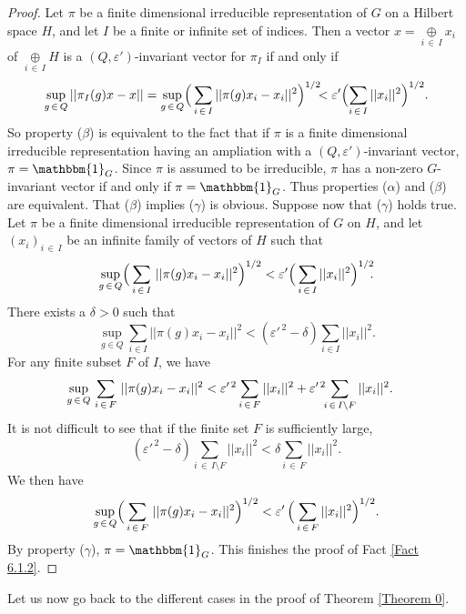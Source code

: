 \documentclass[11pt,english,a4paper]{smfart}
\numberwithin{equation}{section}
\theoremstyle{definition}
\begin{document}
\begin{proof}
 Let $\pi $ be a finite dimensional irreducible  representation of $G$ on 
a Hilbert space $H$, and let $I$ be a finite or infinite set of indices. Then a vector 
$x={\mathop{\oplus}}\limits_{i\,\in\,I}x_{i}$ of ${\mathop{\oplus}}\limits_{i\,\in\,I}H$ is a 
$({Q},\varepsilon')$-invariant vector for $\pi _{I}$ if and only if 
\[
\sup_{g\,\in\,{Q}}||\pi 
_{I}(g)x-x||=\sup_{g\,\in\,{Q}}\Bigl(\,\sum_{i\,\in\,I}||\pi 
(g)x_{i}-x_{i}||^{2} 
\Bigr)^{1/2}\!\!\!<\varepsilon'\Bigl(\sum_{i\,\in\,I}||x_{i}||^{2} \Bigr)^{1/2} .
\]
So property 
($\beta $) is equivalent to the fact that if 
$\pi $ is a finite dimensional irreducible representation having an 
ampliation with a 
$({Q},\varepsilon')$-invariant vector, $\pi =\mathbbm{1}_{G}$. 
Since $\pi $ is assumed to be irreducible, $\pi $ has a non-zero $G$-invariant vector 
if and only if $\pi=\mathbbm{1}_{G}$. Thus pro\-perties
($\alpha $) and ($\beta $) are equivalent. 
That ($\beta $) implies ($\gamma  $) is obvious. Suppose now that ($\gamma $) holds true. 
Let $\pi $ be a finite dimensional irreducible representation of $G$ on $H$, 
and let $(x_{i})_{i\,\in\,I}$ be an infinite family of vectors of $H$ such that
\[
\sup_{g\,\in\,{Q}}\Bigl({\displaystyle}\sum_{i\,\in\,I}\,||\pi (g)x_{i}-x_{i}||^{2} 
\Bigr)^{1/2}<\varepsilon '\Bigl({\displaystyle}\sum_{i\,\in\,I}||x_{i}||^{2}\Bigr)^{1/2}\!\!.
\]
There exists a $\delta >0$ such that 
\[
\sup_{g\in{Q}}\sum_{i\in I}||\pi (g)x_{i}-x_{i}||^{2}<(\varepsilon '^{\,2} -\delta )\sum_{i\in I}||x_{i}||^{2}.
\]
For any finite subset $F$ of $I$, we have 
\begin{align*}
\sup_{g\,\in\,{Q}}{\displaystyle}\sum_{i\,\in\,F}\,||\pi (g)x_{i}-x_{i}||^{2} 
&<\varepsilon '^{\,2} {\displaystyle}\sum_{i\,\in\,F}||x_{i}||^{2}+\varepsilon '^{\,2} \!\! {\displaystyle}\sum_{i\,\in\,I\setminus F}||x_{i}||^{2}.
\end{align*}
It is not difficult to see that if the finite set $F$ is sufficiently large, 
\[
(\varepsilon '^{\,2} -\delta )\sum_{i\,\in\,I\setminus F}||x_{i}||^{2}<\delta \sum_{i\,\in\,F}||x_{i}||^{2}.
\]
We then have 
\[
\sup_{g\,\in\,{Q}}\Bigl({\displaystyle}\sum_{i\,\in\,F}\,||\pi (g)x_{i}-x_{i}||^{2} 
\Bigr)^{1/2}<{\varepsilon '}\, \Bigl({\displaystyle}\sum_{i\,\in\,F}||x_{i}||^{2}\Bigr)^{1/2}.
\]
By property ($\gamma $), $\pi=\mathbbm{1}_{G}$. This finishes the proof of Fact \ref{Fact 6.1.2}.
\end{proof}

Let us now go back to the different cases in the proof of Theorem 
\ref{Theorem 0}.
\end{document}
